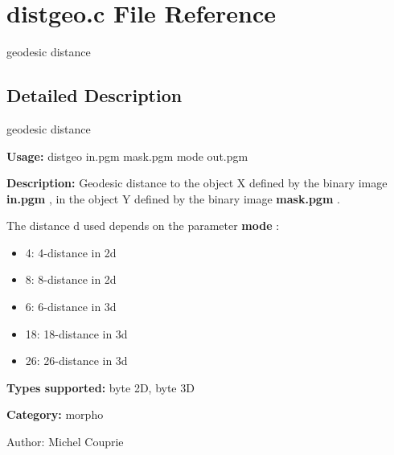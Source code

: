 \section{distgeo.c File Reference}
\label{distgeo_8c}
geodesic distance  




\label{_details}
\subsection{Detailed Description}
geodesic distance 

{\bf Usage:} distgeo in.pgm mask.pgm mode out.pgm

{\bf Description:} Geodesic distance to the object X defined by the binary image {\bf in.pgm} , in the object Y defined by the binary image {\bf mask.pgm} .

The distance d used depends on the parameter {\bf mode} : \begin{itemize}
\item 4: 4-distance in 2d \item 8: 8-distance in 2d \item 6: 6-distance in 3d \item 18: 18-distance in 3d \item 26: 26-distance in 3d\end{itemize}
{\bf Types supported:} byte 2D, byte 3D

{\bf Category:} morpho

\begin{Desc}
\item[Author:]Michel Couprie \end{Desc}
